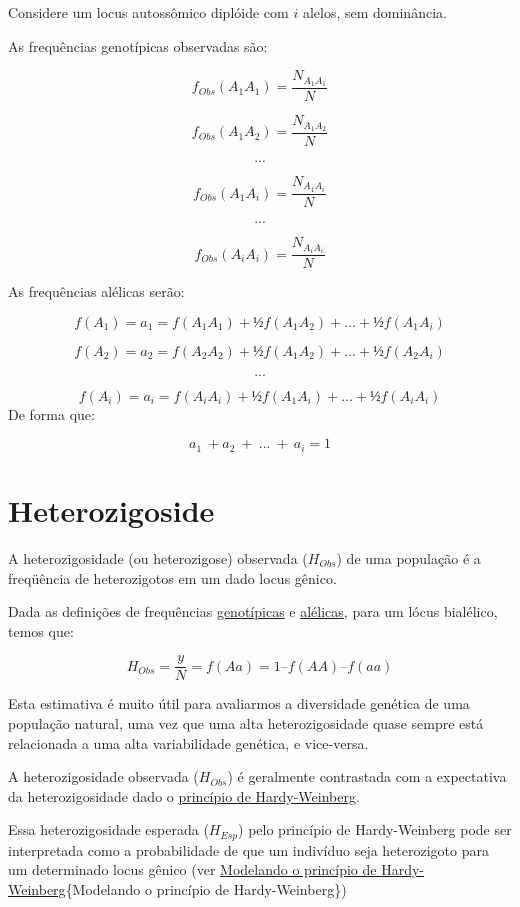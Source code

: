 \documentclass[
]{book}
\begin{document}
Considere um locus autossômico diplóide com \(i\) alelos, sem dominância.

As frequências genotípicas observadas são:

\[f_{Obs}(A_1A_1) = \frac{N_{A_1A_1}}{N}\]

\[f_{Obs}(A_1A_2) = \frac{N_{A_1A_2}}{N}\]

\[...\]

\[f_{Obs}(A_1A_i) = \frac{N_{A_1A_i}}{N}\]

\[...\]

\[f_{Obs}(A_iA_i) = \frac{N_{A_iA_i}}{N}\]

As frequências alélicas serão:

\[f(A_1)  = a_1 =   f(A_1A_1) + ½ f(A_1A_2) + … + ½ f(A_1A_i)\]

\[f(A_2)  = a_2 =   f(A_2A_2) + ½ f(A_1A_2) + … + ½ f(A_2A_i)\]

\[...\]

\[f(A_i)  = a_i =   f(A_iA_i) + ½ f(A_1A_i) + … + ½ f(A_iA_i)\]
De forma que:

\[a_1 \ + a_2 \ + \ ... \ + \ a_i = 1\]

\hypertarget{heterozigoside}{%
\section{Heterozigoside}\label{heterozigoside}}

A heterozigosidade (ou heterozigose) observada (\(H_{Obs}\)) de uma população é a freqüência de heterozigotos em um dado locus gênico.

Dada as definições de frequências \protect\hyperlink{frequuxeancias-genotuxedpicas}{genotípicas} e \protect\hyperlink{frequuxeancias-genotuxedpicas}{alélicas}, para um lócus bialélico, temos que:

\[H_{Obs} = \frac{y}{N} = f(Aa) =  1 – f(AA) – f(aa)\]

Esta estimativa é muito útil para avaliarmos a diversidade genética de uma população natural, uma vez que uma alta heterozigosidade quase sempre está relacionada a uma alta variabilidade genética, e vice-versa.

A heterozigosidade observada (\(H_{Obs}\)) é geralmente contrastada com a expectativa da heterozigosidade dado o \protect\hyperlink{princuxedpio-de-hardy-weinberg}{princípio de Hardy-Weinberg}.

Essa heterozigosidade esperada (\(H_{Esp}\)) pelo princípio de Hardy-Weinberg pode ser interpretada como a probabilidade de que um indivíduo seja heterozigoto para um determinado locus gênico (ver \protect\hyperlink{modelando-o-princuxedpio-de-hardy-weinberg}{Modelando o princípio de Hardy-Weinberg}\{Modelando o princípio de Hardy-Weinberg\})
\end{document}
